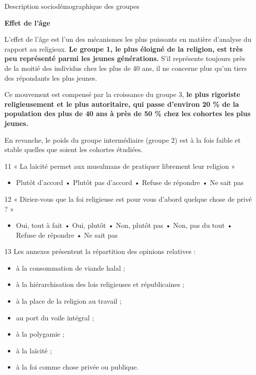 Description sociodémographique des groupes


\textbf{Effet de l'âge}

L'effet de l'âge est l'un des mécanismes les plus puissants en matière
d'analyse du rapport au religieux. \textbf{Le groupe 1, le plus éloigné
de la religion, est très peu représenté parmi les jeunes générations.}
S'il représente toujours près de la moitié des individus chez les plus
de 40 ans, il ne concerne plus qu'un tiers des répondants les plus
jeunes.

Ce mouvement est compensé par la croissance du groupe 3, \textbf{le plus
rigoriste religieusement et le plus autoritaire, qui passe d'environ 20
\% de la population des plus de 40 ans à près de 50 \% chez les cohortes
les plus jeunes.}

En revanche, le poids du groupe intermédiaire (groupe 2) est à la fois
faible et stable quelles que soient les cohortes étudiées.

11 « La laïcité permet aux musulmans de pratiquer librement leur
religion »


\begin{itemize}
\item
  Plutôt d'accord • Plutôt pas d'accord • Refuse de répondre • Ne sait
  pas
\end{itemize}


12 « Diriez-vous que la foi religieuse est pour vous d'abord quelque
chose de privé ? »


\begin{itemize}
\item
  Oui, tout à fait • Oui, plutôt • Non, plutôt pas • Non, pas du tout •
  Refuse de répondre • Ne sait pas
\end{itemize}


13 Les annexes présentent la répartition des opinions relatives :


\begin{itemize}
\item
  à la consommation de viande halal ;
\item
  à la hiérarchisation des lois religieuses et républicaines ;
\item
  à la place de la religion au travail ;
\item
  au port du voile intégral ;
\item
  à la polygamie ;
\item
  à la laïcité ;
\item
  à la foi comme chose privée ou publique.
\end{itemize}


